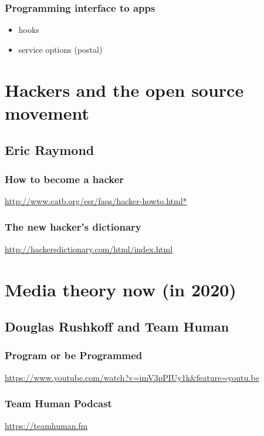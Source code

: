 \documentclass[11pt]{article}
\begin{document}
\subsubsection*{Programming interface to apps}
\label{sec:orga795e5e}
\begin{itemize}
\item hooks
\item service options (postal)
\end{itemize}




\section*{Hackers and the open source movement}
\label{sec:orgcbff4ac}
\subsection*{Eric Raymond}
\label{sec:org58f131b}
\subsubsection*{How to become a hacker}
\label{sec:orge324aa5}
\url{http://www.catb.org/esr/faqs/hacker-howto.html*}

\subsubsection*{The new hacker's dictionary}
\label{sec:orgbe8830b}
\url{http://hackersdictionary.com/html/index.html}


\section*{Media theory now (in 2020)}
\label{sec:orgfbd7357}

\subsection*{Douglas Rushkoff and Team Human}
\label{sec:org7057bb6}
\subsubsection*{Program or be Programmed}
\label{sec:org0d9f7f0}
\url{https://www.youtube.com/watch?v=imV3pPIUy1k\&feature=youtu.be}

\subsubsection*{Team Human Podcast}
\label{sec:orga72fdb8}
\url{https://teamhuman.fm}
\end{document}
